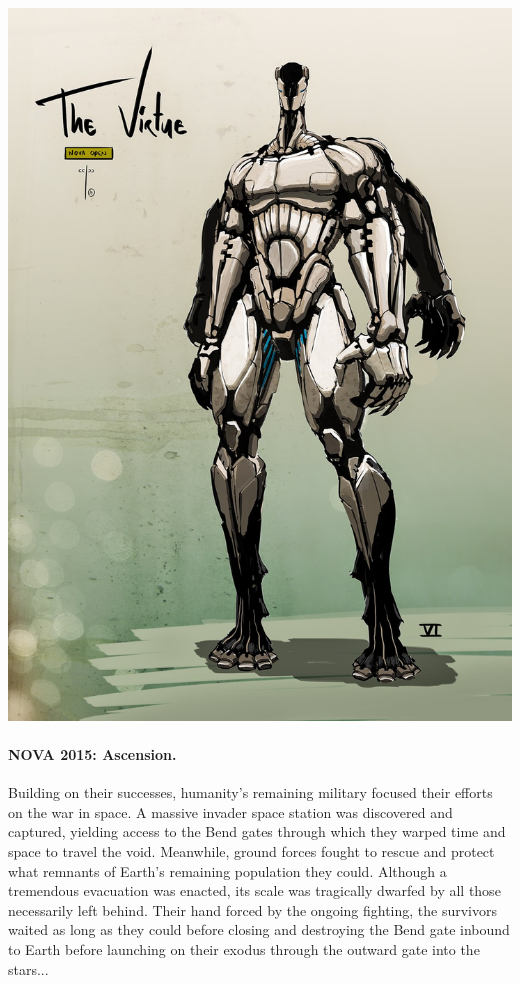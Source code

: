 \begin{minipage}[c]{0.4\linewidth}%
  \includegraphics[width=\linewidth]{art/characters/virtue-warrior.jpg}
\end{minipage}

\paragraph{NOVA 2015: Ascension.}  Building on their successes,
humanity's remaining military focused their efforts on the war in
space.  A massive invader space station was discovered and captured,
yielding access to the Bend gates through which they warped time and
space to travel the void.  Meanwhile, ground forces fought to rescue
and protect what remnants of Earth's remaining population they could.
Although a tremendous evacuation was enacted, its scale was tragically
dwarfed by all those necessarily left behind.  Their hand forced by
the ongoing fighting, the survivors waited as long as they could
before closing and destroying the Bend gate inbound to Earth before
launching on their exodus through the outward gate into the stars...

